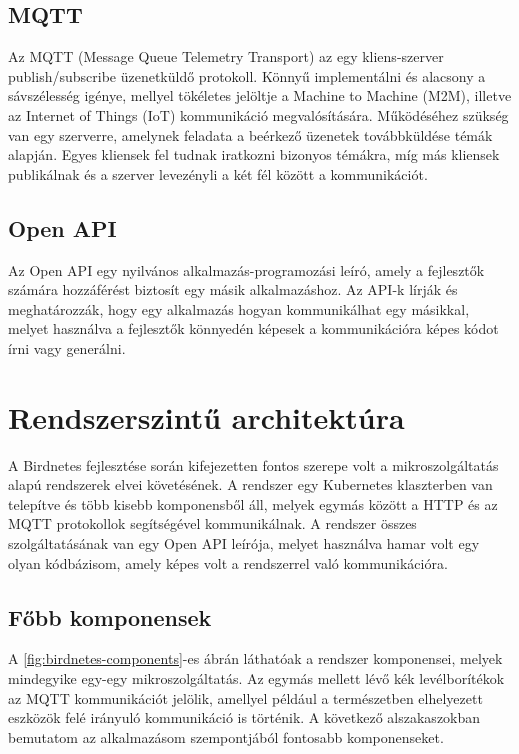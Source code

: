 \subsection{MQTT}
\label{subsect:mqtt}
Az MQTT (Message Queue Telemetry Transport) az egy kliens-szerver publish/subscribe üzenetküldő protokoll. Könnyű implementálni és alacsony a sávszélesség igénye,
mellyel tökéletes jelöltje a Machine to Machine (M2M), illetve az Internet of Things (IoT) kommunikáció megvalósítására.
Működéséhez szükség van egy szerverre, amelynek feladata a beérkező üzenetek továbbküldése témák alapján. Egyes kliensek fel tudnak iratkozni bizonyos témákra, míg más kliensek publikálnak
és a szerver levezényli a két fél között a kommunikációt.

\subsection{Open API}
Az Open API egy nyilvános alkalmazás-programozási leíró, amely a fejlesztők számára hozzáférést biztosít egy másik alkalmazáshoz.
Az API-k lírják és meghatározzák, hogy egy alkalmazás hogyan kommunikálhat egy másikkal, 
melyet használva a fejlesztők könnyedén képesek a kommunikációra képes kódot írni vagy generálni.

\section{Rendszerszintű architektúra}
A Birdnetes fejlesztése során kifejezetten fontos szerepe volt a mikroszolgáltatás alapú rendszerek elvei követésének.
A rendszer egy Kubernetes klaszterben van telepítve és több kisebb komponensből áll, melyek egymás között a HTTP és az MQTT protokollok segítségével kommunikálnak.
A rendszer összes szolgáltatásának van egy Open API leírója, melyet használva hamar volt egy olyan kódbázisom, amely képes volt a rendszerrel való kommunikációra.


\subsection{Főbb komponensek}
A \ref{fig:birdnetes-components}-es ábrán láthatóak a rendszer komponensei, melyek mindegyike egy-egy mikroszolgáltatás.
Az egymás mellett lévő kék levélborítékok az MQTT kommunikációt jelölik,
amellyel például a természetben elhelyezett eszközök felé irányuló kommunikáció is történik.
A következő alszakaszokban bemutatom az alkalmazásom szempontjából fontosabb komponenseket.

